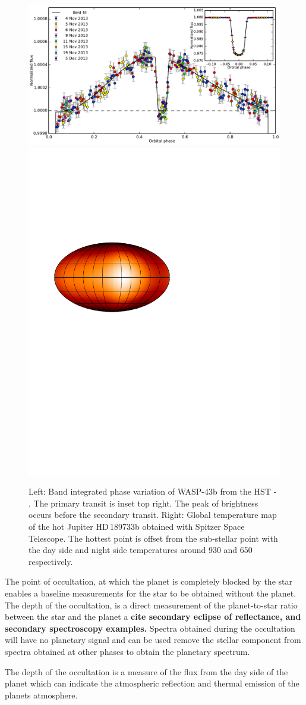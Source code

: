 \begin{figure}
    \centering
    \includegraphics[width=0.5\linewidth]{figures/introduction/stevenson_phasecurve2014.pdf}
     \includegraphics[width=0.4\linewidth]{figures/introduction/knutson_2007_temperature_map_HD_189733b.pdf}
    \caption{Left: Band integrated phase variation of {WASP-43b} from the HST - \cite{stevenson_thermal_2014}. The primary transit is inset top right.
        The peak of brightness occurs before the secondary transit.
    Right: Global temperature map of the hot Jupiter HD\,189733b obtained with {Spitzer Space Telescope}\citep{knutson_map_2007}. The hottest point is offset from the sub-stellar point with the day side and night side temperatures around 930\K{} and 650\K{} respectively.}
    \label{fig:stevensonphasecurve2014}
\end{figure}

The point of occultation, at which the planet is completely blocked by the star enables a baseline measurements for the star to be obtained without the planet. The depth of the occultation, is a direct measurement of the planet-to-star ratio between the star and the planet a \textbf{{cite secondary eclipse of reflectance, and secondary spectroscopy examples}.} Spectra obtained during the occultation will have no planetary signal and can be used remove the stellar component from spectra obtained at other phases to obtain the planetary spectrum.


The depth of the occultation is a measure of the flux from the day side of the planet which can indicate the atmospheric reflection and thermal emission of the planets atmosphere.


